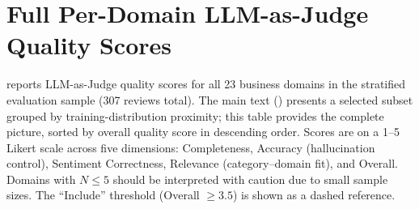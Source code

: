 \documentclass[bdcc,article,submit,moreauthors]{Definitions/mdpi}
\begin{document}




\appendixstart
\appendix
\section[\appendixname~\thesection]{Full Per-Domain LLM-as-Judge Quality Scores}
\label{sec:appendix_domains}

 reports LLM-as-Judge quality scores for all 23 business domains in the stratified evaluation sample (307 reviews total). The main text () presents a selected subset grouped by training-distribution proximity; this table provides the complete picture, sorted by overall quality score in descending order. Scores are on a 1--5 Likert scale across five dimensions: Completeness, Accuracy (hallucination control), Sentiment Correctness, Relevance (category--domain fit), and Overall. Domains with $N \leq 5$ should be interpreted with caution due to small sample sizes. The ``Include'' threshold (Overall $\geq 3.5$) is shown as a dashed reference.
\end{document}
